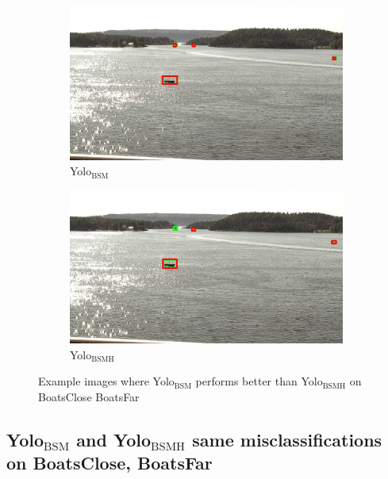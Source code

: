 \begin{figure}[h!]
\begin{subfigure}{.5\textwidth}
  \centering
  \includegraphics[width=0.9\linewidth]{results/case_buildings/yolo23/2better/yolo2/selected_08_11_frame0530.jpg}
  \caption{Yolo$_{\text{BSM}}$}
\end{subfigure}%
\begin{subfigure}{.5\textwidth}
  \centering
  \includegraphics[width=.9\linewidth]{results/case_buildings/yolo23/2better/yolo3/selected_08_11_frame0530.jpg}
  \caption{Yolo$_{\text{BSMH}}$}
\end{subfigure}
\caption{Example images where Yolo$_{\text{BSM}}$ performs better than Yolo$_{\text{BSMH}}$ on BoatsClose BoatsFar}
\label{img:yolo2_better}

\end{figure}

\newpage

\subsection{Yolo$_{\text{BSM}}$ and Yolo$_{\text{BSMH}}$ same misclassifications on BoatsClose, BoatsFar}
\label{sec:same_mistake}


